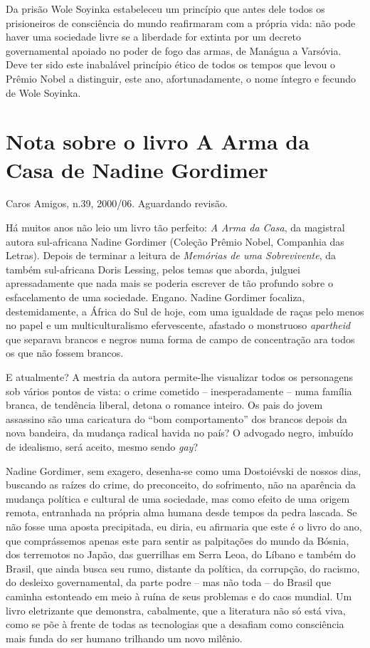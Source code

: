 \documentclass[
  letterpaper,
  DIV=11,
  numbers=noendperiod]{scrreprt}
\begin{document}
Da prisão Wole Soyinka estabeleceu um princípio que antes dele todos os
prisioneiros de consciência do mundo reafirmaram com a própria vida: não
pode haver uma sociedade livre se a liberdade for extinta por um decreto
governamental apoiado no poder de fogo das armas, de Manágua a Varsóvia.
Deve ter sido este inabalável princípio ético de todos os tempos que
levou o Prêmio Nobel a distinguir, este ano, afortunadamente, o nome
íntegro e fecundo de Wole Soyinka.

\chapter{Nota sobre o livro A Arma da Casa de Nadine
Gordimer}\label{nota-sobre-o-livro-a-arma-da-casa-de-nadine-gordimer}

Caros Amigos, n.39, 2000/06. Aguardando revisão.

\hfill\break

Há muitos anos não leio um livro tão perfeito: \emph{A Arma da Casa}, da
magistral autora sul-africana Nadine Gordimer (Coleção Prêmio Nobel,
Companhia das Letras). Depois de terminar a leitura de \emph{Memórias de
uma Sobrevivente}, da também sul-africana Doris Lessing, pelos temas que
aborda, julguei apressadamente que nada mais se poderia escrever de tão
profundo sobre o esfacelamento de uma sociedade. Engano. Nadine Gordimer
focaliza, destemidamente, a África do Sul de hoje, com uma igualdade de
raças pelo menos no papel e um multiculturalismo efervescente, afastado
o monstruoso \emph{apartheid} que separava brancos e negros numa forma
de campo de concentração ara todos os que não fossem brancos.

E atualmente? A mestria da autora permite-lhe visualizar todos os
personagens sob vários pontos de vista: o crime cometido --
inesperadamente -- numa família branca, de tendência liberal, detona o
romance inteiro. Os pais do jovem assassino são uma caricatura do ``bom
comportamento'' dos brancos depois da nova bandeira, da mudança radical
havida no país? O advogado negro, imbuído de idealismo, será aceito,
mesmo sendo \emph{gay}?

Nadine Gordimer, sem exagero, desenha-se como uma Dostoiévski de nossos
dias, buscando as raízes do crime, do preconceito, do sofrimento, não na
aparência da mudança política e cultural de uma sociedade, mas como
efeito de uma origem remota, entranhada na própria alma humana desde
tempos da pedra lascada. Se não fosse uma aposta precipitada, eu diria,
eu afirmaria que este é o livro do ano, que comprássemos apenas este
para sentir as palpitações do mundo da Bósnia, dos terremotos no Japão,
das guerrilhas em Serra Leoa, do Líbano e também do Brasil, que ainda
busca seu rumo, distante da política, da corrupção, do racismo, do
desleixo governamental, da parte podre -- mas não toda -- do Brasil que
caminha estonteado em meio à ruína de seus problemas e do caos mundial.
Um livro eletrizante que demonstra, cabalmente, que a literatura não só
está viva, como se põe à frente de todas as tecnologias que a desafiam
como consciência mais funda do ser humano trilhando um novo milênio.
\end{document}
